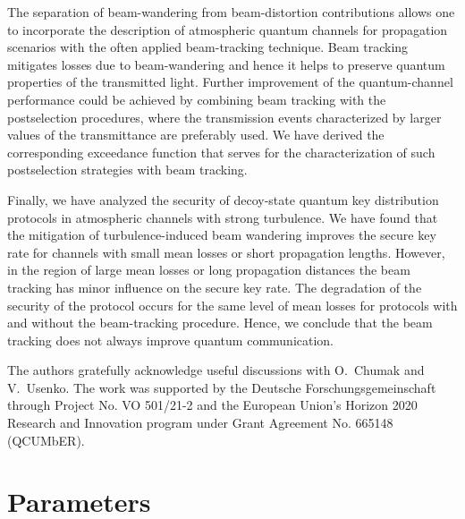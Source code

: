 \documentclass[aps,pra,twocolumn,a4paper,nofootinbib,preprintnumbers] {revtex4-1}
\begin{document}
	
	The separation of beam-wandering from beam-distortion contributions allows one to incorporate the description of atmospheric quantum channels for propagation scenarios with the often applied beam-tracking technique.
	Beam tracking mitigates losses due to beam-wandering and hence it helps to preserve quantum properties of the transmitted light.
	Further improvement of the quantum-channel performance could be achieved by combining beam tracking with the postselection procedures, where the transmission events characterized by larger values of the transmittance are preferably used.
	We have derived the corresponding exceedance function that serves for the characterization of such postselection strategies with beam tracking.
	
	Finally, we have analyzed the security of decoy-state quantum key distribution protocols in atmospheric channels with strong turbulence.
	We have found that the mitigation of turbulence-induced beam wandering improves the  secure key rate for channels with small mean losses or short propagation lengths.
	However, in the region of large mean losses or long propagation distances the beam tracking has minor influence on the secure key rate.
	The degradation of the security of the protocol occurs for the same level of mean losses for protocols with and without the beam-tracking procedure.
	Hence, we conclude that the beam tracking does not always improve quantum communication.


\acknowledgments  The authors gratefully acknowledge useful discussions with O.~Chumak and V.~Usenko.
The work was supported by the Deutsche Forschungsgemeinschaft through Project No. VO 501/21-2 and the European Union's Horizon 2020 Research and Innovation program under Grant Agreement No. 665148 (QCUMbER).

\appendix



\section{Parameters}\label{app:parameters}
\end{document}
